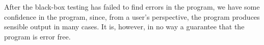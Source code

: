 \documentclass[fsharpNotes.tex]{subfiles}
\begin{document}
After the black-box testing has failed to find errors in the program, we have some confidence in the program, since, from a user's perspective, the program produces sensible output in many cases. It is, however, in no way a guarantee that the program is error free.

\end{document}
